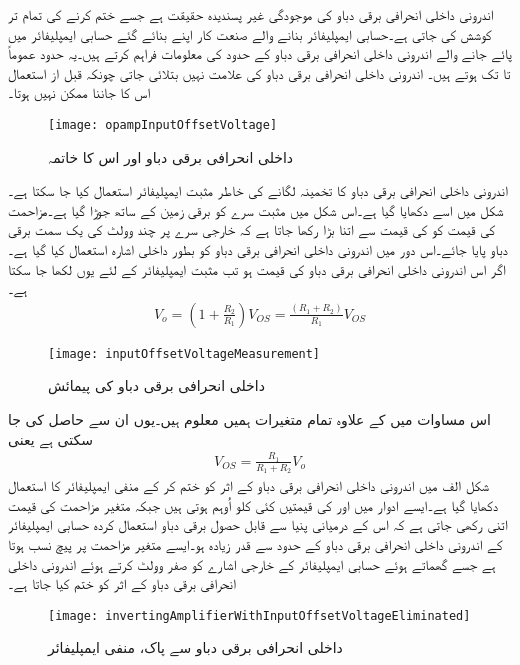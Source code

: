 	اندرونی داخلی انحرافی برقی دباو کی موجودگی غیر پسندیدہ حقیقت ہے جسے ختم کرنے کی تمام تر کوشش کی جاتی ہے۔حسابی ایمپلیفائر بنانے والے صنعت کار اپنے بنائے گئے حسابی ایمپلیفائر میں پائے جانے والے اندرونی داخلی انحرافی برقی دباو کے حدود کی معلومات فراہم کرتے ہیں۔یہ حدود عموماً   تا  تک ہوتے ہیں۔ اندرونی داخلی انحرافی برقی دباو کی علامت نہیں بتلائی جاتی چونکہ قبل از استعمال اس کا جاننا ممکن نہیں ہوتا۔
\begin{figure}
\centering
\texttt{[image: opampInputOffsetVoltage]}
\caption{داخلی انحرافی برقی دباو اور اس کا خاتمہ}
\label{شکل_انحرافی_برقی_دباو_اور_اس_کا_خاتمہ}
\end{figure}
اندرونی داخلی انحرافی برقی دباو کا تخمینہ لگانے کی خاطر مثبت ایمپلیفائر استعمال کیا جا سکتا ہے۔شکل  میں اسے دکھایا گیا ہے۔اس شکل میں مثبت سرے کو برقی زمین کے ساتھ جوڑا گیا ہے۔مزاحمت  کی قیمت کو  کی قیمت سے اتنا بڑا رکھا جاتا ہے کہ خارجی  سرے پر چند وولٹ کی یک سمت برقی دباو  پایا جائے۔اس دور میں اندرونی داخلی انحرافی برقی دباو کو بطور داخلی اشارہ استعمال کیا گیا ہے۔اگر اس اندرونی داخلی انحرافی برقی دباو کی قیمت  ہو تب مثبت ایمپلیفائر کے لئے یوں لکھا جا سکتا ہے۔
\begin{align}
V_{o}=\left (1+\frac{R_2}{R_1} \right ) V_{OS} =\frac{\left (R_1+R_2 \right )}{R_1} V_{OS}
\end{align}
%
\begin{figure}
\centering
\texttt{[image: inputOffsetVoltageMeasurement]}
\caption{داخلی انحرافی برقی دباو کی پیمائش}
\label{شکل_داخلی_انحرافی_برقی_دباو_کی_پیمائش}
\end{figure}
اس مساوات میں  کے علاوہ تمام متغیرات ہمیں معلوم ہیں۔یوں ان سے حاصل کی جا سکتی ہے یعنی
\begin{align}
V_{OS}=\frac{R_1}{R_1+R_2} V_{o}
\end{align}
شکل  الف میں اندرونی داخلی انحرافی برقی دباو کے اثر کو ختم کر کے منفی ایمپلیفائر کا استعمال دکھایا گیا ہے۔ایسے ادوار میں  اور کی قیمتیں کئی کلو اُوہم   ہوتی ہیں جبکہ متغیر مزاحمت  کی قیمت اتنی رکھی جاتی ہے کہ اس کے درمیانی پنیا سے قابل حصول برقی دباو استعمال کردہ حسابی ایمپلیفائر کے اندرونی داخلی انحرافی برقی دباو  کے حدود سے قدر زیادہ ہو۔ایسے متغیر مزاحمت پر پیچ نسب ہوتا ہے جسے گھماتے ہوئے حسابی ایمپلیفائر کے خارجی اشارے  کو صفر وولٹ کرتے ہوئے اندرونی داخلی انحرافی برقی دباو کے اثر کو ختم کیا جاتا ہے۔
\begin{figure}
\centering
\texttt{[image: invertingAmplifierWithInputOffsetVoltageEliminated]}
\caption{داخلی انحرافی برقی دباو سے پاک، منفی ایمپلیفائر}
\label{شکل_داخلی_انحرافی_برقی_دباو_سے_پاک_منفی_ایمپلیفائر}
\end{figure}

